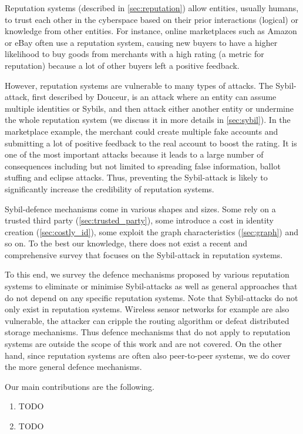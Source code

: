 Reputation systems (described in \autoref{sec:reputation}) allow entities,
usually humans, to trust each other in the cyberspace based on their prior
interactions (logical) or knowledge from other entities. For instance, online
marketplaces such as Amazon or eBay often use a reputation system, causing new
buyers to have a higher likelihood to buy goods from merchants with a high
rating (a metric for reputation) because a lot of other buyers left a positive
feedback.

However, reputation systems are vulnerable to many types of attacks. The
Sybil-attack, first described by Douceur\cite{douceur2002sybil}, is an attack
where an entity can assume multiple identities or Sybils, and then attack either
another entity or undermine the whole reputation system (we discuss it in more
details in \autoref{sec:sybil}). In the marketplace example, the merchant could
create multiple fake accounts and submitting a lot of positive feedback to the
real account to boost the rating. It is one of the most important attacks
because it leads to a large number of consequences including but not limited to
spreading false information, ballot stuffing\cite{bhattacharjee2005avoiding} and
eclipse attacks\cite{singh2006eclipse}. Thus, preventing the Sybil-attack is
likely to significantly increase the credibility of reputation systems.

Sybil-defence mechanisms come in various shapes and sizes. Some rely on a
trusted third party (\autoref{sec:trusted_party}), some introduce a cost in
identity creation (\autoref{sec:costly_id}), some exploit the graph
characteristics (\autoref{sec:graph}) and so on. To the best our knowledge,
there does not exist a recent and comprehensive survey that focuses on the
Sybil-attack in reputation systems.

To this end, we survey the defence mechanisms proposed by various reputation
systems to eliminate or minimise Sybil-attacks as well as general approaches
that do not depend on any specific reputation systems. Note that Sybil-attacks
do not only exist in reputation systems. Wireless sensor networks for example
are also vulnerable, the attacker can cripple the routing algorithm or defeat
distributed storage mechanisms\cite{newsome2004sybil}. Thus defence mechanisms
that do not apply to reputation systems are outside the scope of this work and
are not covered. On the other hand, since reputation systems are often also
peer-to-peer systems, we do cover the more general defence mechanisms.

Our main contributions are the following.
\begin{enumerate}
  \item TODO
  \item TODO
\end{enumerate}

